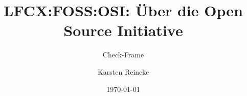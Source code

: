 \documentclass[]{beamer}
\title{LFCX:FOSS:OSI: Über die Open Source Initiative}
\subtitle{Check-Frame}
\institute[GS-LDK]{Gewerbliche Schulen Dillenburg}
\author{Karsten Reincke}
\date{\today}
\def\cfgGl{../../../../cfg.gl/}
\begin{document}

\begin{frame}
  \titlepage

  

  
\end{frame}






\logo{}
\newpage



%
\end{document}
